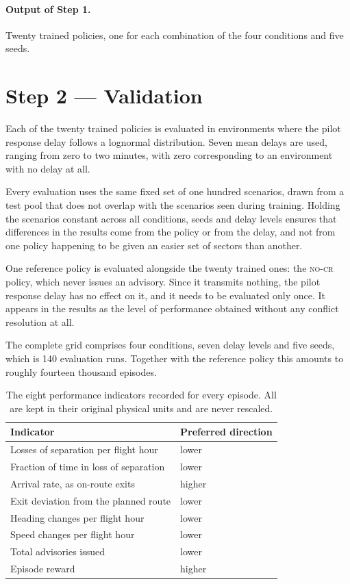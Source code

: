 \documentclass[11pt,a4paper]{article}
\newcommand{\nocr}{\textsc{no-cr}}
\begin{document}
\paragraph{Output of Step 1.} Twenty trained policies, one for each combination
of the four conditions and five seeds.

\section{Step 2 --- Validation}

Each of the twenty trained policies is evaluated in environments where the pilot
response delay follows a lognormal distribution. Seven mean delays are used,
ranging from zero to two minutes, with zero corresponding to an environment
with no delay at all.

Every evaluation uses the same fixed set of one hundred scenarios, drawn from a
test pool that does not overlap with the scenarios seen during training. Holding
the scenarios constant across all conditions, seeds and delay levels ensures
that differences in the results come from the policy or from the delay, and not
from one policy happening to be given an easier set of sectors than another.

One reference policy is evaluated alongside the twenty trained ones: the \nocr{}
policy, which never issues an advisory. Since it transmits nothing, the pilot
response delay has no effect on it, and it needs to be evaluated only once. It
appears in the results as the level of performance obtained without any conflict
resolution at all.

The complete grid comprises four conditions, seven delay levels and five seeds,
which is 140 evaluation runs. Together with the reference policy this amounts to
roughly fourteen thousand episodes.

\begin{table}[h]
\centering
\begin{tabular}{@{}ll@{}}
\toprule
Indicator & Preferred direction \\
\midrule
Losses of separation per flight hour   & lower \\
Fraction of time in loss of separation & lower \\
Arrival rate, as on-route exits        & higher \\
Exit deviation from the planned route  & lower \\
Heading changes per flight hour        & lower \\
Speed changes per flight hour          & lower \\
Total advisories issued                & lower \\
Episode reward                         & higher \\
\bottomrule
\end{tabular}
\caption{The eight performance indicators recorded for every episode. All are
kept in their original physical units and are never rescaled.}
\label{tab:kpis}
\end{table}
\end{document}
